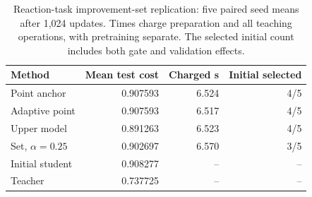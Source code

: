 \begin{table}[htbp]\centering\small
\caption{Reaction-task improvement-set replication: five paired seed means after 1,024 updates. Times charge preparation and all teaching operations, with pretraining separate. The selected initial count includes both gate and validation effects.}
\label{tab:set-replication}
\begin{tabular}{lrrr}\toprule
Method & Mean test cost & Charged s & Initial selected \\ \midrule
Point anchor & 0.907593 & 6.524 & 4/5 \\
Adaptive point & 0.907593 & 6.517 & 4/5 \\
Upper model & 0.891263 & 6.523 & 4/5 \\
Set, $\alpha=0.25$ & 0.902697 & 6.570 & 3/5 \\
\midrule
Initial student & 0.908277 & -- & -- \\
Teacher & 0.737725 & -- & -- \\
\bottomrule\end{tabular}\end{table}
